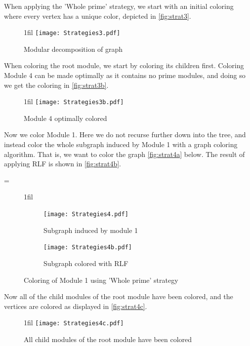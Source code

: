 \documentclass[a4paper]{article}
\makeatletter
\newcommand*{\centerfloat}{%
  \parindent \z@
  \leftskip \z@ \@plus 1fil \@minus \textwidth
  \rightskip\leftskip
  \parfillskip \z@skip}
\makeatother
\begin{document}
When applying the 'Whole prime' strategy, we start with an initial coloring 
where every vertex has a unique color, depicted in \autoref{fig:strat3}.

\begin{figure}[H]
    \centerfloat
    \texttt{[image: Strategies3.pdf]}
    \caption{Modular decomposition of graph}
    \label{fig:strat3}
\end{figure}

When coloring the root module, we start by coloring its children first.
Coloring Module 4 can be made optimally as it contains no prime modules, and
doing so we get the coloring in \autoref{fig:strat3b}.

\begin{figure}[H]
    \centerfloat
    \texttt{[image: Strategies3b.pdf]}
    \caption{Module 4 optimally colored}
    \label{fig:strat3b}
\end{figure}

Now we color Module 1. Here we do not recurse further down into the tree, and
instead color the whole subgraph induced by Module 1 with a graph coloring
algorithm. That is, we want to color the graph \autoref{fig:strat4a} below.
The result of applying RLF is shown in \autoref{fig:strat4b}.

\newdimen\pairwidth
\pairwidth=\dimexpr {} \relax

\begin{figure}[H]
\centerfloat
    \begin{subfigure}{\pairwidth}
        \texttt{[image: Strategies4.pdf]}
      \caption{Subgraph induced by module 1}
      \label{fig:strat4a}
    \end{subfigure}%
    \begin{subfigure}{\pairwidth}
        \texttt{[image: Strategies4b.pdf]}
      \caption{Subgraph colored with RLF}
      \label{fig:strat4b}
    \end{subfigure}
\caption{Coloring of Module 1 using 'Whole prime' strategy}
\label{fig:strat4}
\end{figure}

Now all of the child modules of the root module have been colored, and the vertices
are colored as displayed in \autoref{fig:strat4c}.

\begin{figure}[H]
    \centerfloat
    \texttt{[image: Strategies4c.pdf]}
    \caption{All child modules of the root module have been colored}
    \label{fig:strat4c}
\end{figure}
\end{document}
